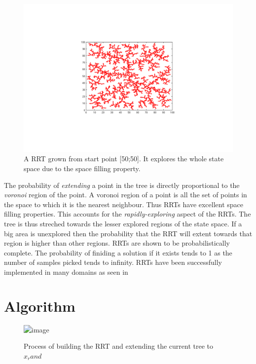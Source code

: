 \documentclass[MTech]{iitmdiss}
\begin{document}
  \begin{figure}[htpb]
   \begin{center}
   \includegraphics[scale=0.45] {rrt-basic}
     \caption { A RRT grown from start point [50;50]. It explores the whole state space due to the space filling property.}
   \label{fig:rrt-basic}
   \end{center}
 \end{figure}

The probability of \emph{extending} a point in the tree is directly proportional to the \emph{voronoi} region of the point. A voronoi region of a point is all the set of points in the space to which it is the nearest neighbour. Thus RRTs have excellent space filling properties. This accounts for the \emph{rapidly-exploring} aspect of the RRTs. The tree is thus streched towards the lesser explored regions of the state space. If a big area is unexplored then the probability that the RRT will extent towards that region is higher than other regions. RRTs are shown to be probabilistically complete. The probability of finiding a solution if it exists tends to 1 as the number of samples picked tends to infinity. RRTs have been successfully implemented in many domains as seen in \cite{lav01, bruce02, kuffner03, kim03, oriolo04}

\section{Algorithm}
 \begin{figure}[htpb]
   \begin{center}
     \resizebox{75mm}{75mm} {\includegraphics *{rrt}}
     \caption {Process of building the RRT and extending the current tree to $x_rand$}
   \label{fig:rrt-extend}
   \end{center}
 \end{figure}
\end{document}
